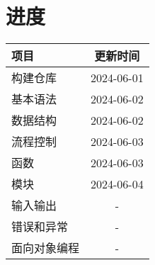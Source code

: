 \documentclass[a4paper,12pt]{article}
\begin{document}
    \section{进度}
        \begin{table}
        \centering
            \begin{tabular}{lc}
                项目                    &   更新时间 \\
                \hline
                构建仓库                &   2024-06-01 \\
                基本语法                &   2024-06-02 \\
                数据结构                &   2024-06-02 \\
                流程控制                &   2024-06-03 \\
                函数                    &   2024-06-03 \\
                模块                    &   2024-06-04 \\
                输入输出                &   - \\
                错误和异常                &   - \\
                面向对象编程            &   - \\
            \end{tabular}
        \end{table}
\end{document}
